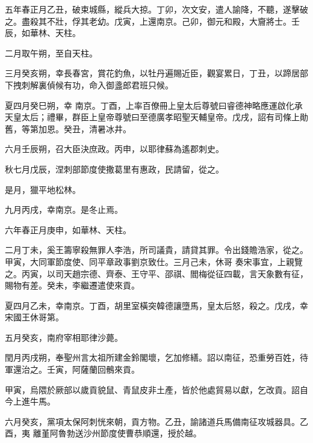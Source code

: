 
\begin{pinyinscope}

 五年春正月乙丑，破束城縣，縱兵大掠。丁卯，次文安，遣人諭降，不聽，遂擊破之。盡殺其不壯，俘其老幼。戊寅，上還南京。己卯，御元和殿，大齎將士。壬辰，如華林、天柱。



 二月取午朔，至自天柱。



 三月癸亥朔，幸長春宮，賞花釣魚，以牡丹遍賜近臣，觀宴累日，丁丑，以蹄居部下拽刺解裏偵候有功，命入御盞郎君班只候。



 夏四月癸巳朔，幸
 南京。丁酉，上率百僚冊上皇太后尊號曰睿德神略應運啟化承天皇太后；禮畢，群臣上皇帝尊號曰至德廣孝昭聖天輔皇帝。戊戌，詔有司條上勛舊，等第加恩。癸丑，清暑冰井。



 六月壬辰朔，召大臣決庶政。丙申，以耶律蘇為遙郡刺史。



 秋七月戊辰，涅刺部節度使撒葛里有惠政，民請留，從之。



 是月，獵平地松林。



 九月丙戌，幸南京。是冬止焉。



 六年春正月庚申，如華林、天柱。



 二月丁未，奚王籌寧殺無罪人李浩，所司議貴，請貸其罪。令出錢贍浩家，從之。甲寅，大同軍節度使、同平章政事劉京致仕。三月己未，休哥
 奏宋事宜，上親覽之。丙寅，以司天趙宗德、齊泰、王守平、邵祺、閻梅從征四載，言天象數有征，賜物有差。癸未，李繼遷遣使來貢。



 夏四月乙未，幸南京。丁酉，胡里室橫突韓德讓墮馬，皇太后怒，殺之。戊戌，幸宋國王休哥第。



 五月癸亥，南府宰相耶律沙薨。



 閏月丙戌朔，奉聖州言太祖所建金鈴閣壞，乞加修繕。詔以南征，恐重勞百姓，待軍還治之。壬寅，阿薩蘭回鶻來貢。



 甲寅，烏隈於厥部以歲貢貌鼠、青鼠皮非土產，皆於他處貿易以獻，乞改貢。詔自今上進牛馬。



 六月癸亥，黨項太保阿刺恍來朝，貢方物。乙丑，諭諸道兵馬備南征攻城器具。乙酉，夷
 離堇阿魯勃送沙州節度使曹恭順還，授於越。




\end{pinyinscope}
